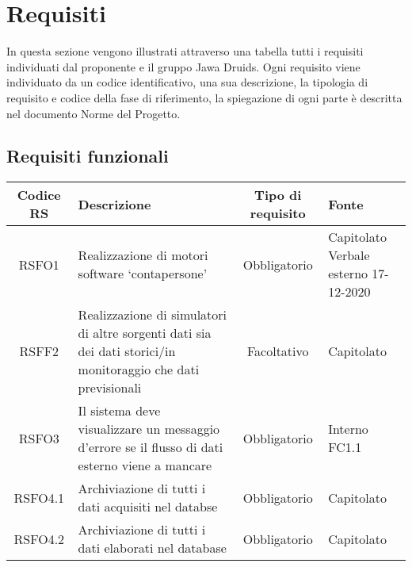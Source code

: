 \chapter{Requisiti}
In questa sezione vengono illustrati attraverso una tabella tutti i requisiti individuati dal proponente e il gruppo Jawa Druids. Ogni requisito viene individuato da un codice identificativo, una sua descrizione, la tipologia di requisito e codice della fase di riferimento, la spiegazione di ogni parte è descritta nel documento Norme del Progetto. 
\section{Requisiti funzionali}



\def\tabularxcolumn#1{m{#1}}
{
	
	\begin{center}
		\renewcommand{\arraystretch}{1.4}
		\begin{tabularx}{\textwidth}{ |c|X|c|X| }
			\hline
			\rowcolor{Melon}
			\textbf{Codice RS} & \textbf{Descrizione} & \textbf{Tipo di requisito} & \textbf{Fonte} \\
			\hline
			RSFO1 & Realizzazione di motori software ‘contapersone’  & Obbligatorio & \makecell[tcX]{Capitolato \\ Verbale esterno 17-12-2020} \\
			\hline
			RSFF2 & Realizzazione di simulatori di altre sorgenti dati sia dei dati storici/in monitoraggio che dati previsionali & Facoltativo & Capitolato \\
			\hline
			RSFO3  & Il sistema deve visualizzare un messaggio d'errore se il flusso di dati esterno viene a mancare  & Obbligatorio & \makecell[tcX]{Interno\\FC1.1}  \\
			\hline
			RSFO4.1 & Archiviazione di tutti i dati acquisiti nel databse & Obbligatorio & Capitolato  \\
				\hline
				RSFO4.2 & Archiviazione di tutti i dati elaborati nel database & Obbligatorio & Capitolato  \\


\end{tabularx}
\end{center}}
